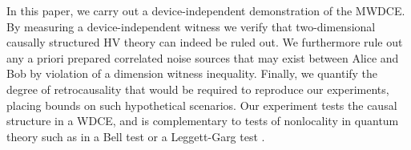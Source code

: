 \documentclass[aps,prl,twocolumn,amsmath,amssymb,nofootinbib,superscriptaddress]{revtex4-1}
\begin{document}
In this paper, we carry out a device-independent demonstration of the MWDCE. 
By measuring a device-independent witness we verify that two-dimensional causally structured HV theory can indeed be ruled out.  We furthermore rule out any a priori prepared correlated noise sources that may exist between Alice and Bob by violation of a dimension witness inequality.  Finally, we quantify the degree of retrocausality that would be required to reproduce our experiments, placing bounds on such hypothetical scenarios. Our experiment tests the causal structure in a WDCE, and is complementary to tests of nonlocality in quantum theory such as in a Bell test or a Leggett-Garg test \cite{Leggett1985}. 




\end{document}
